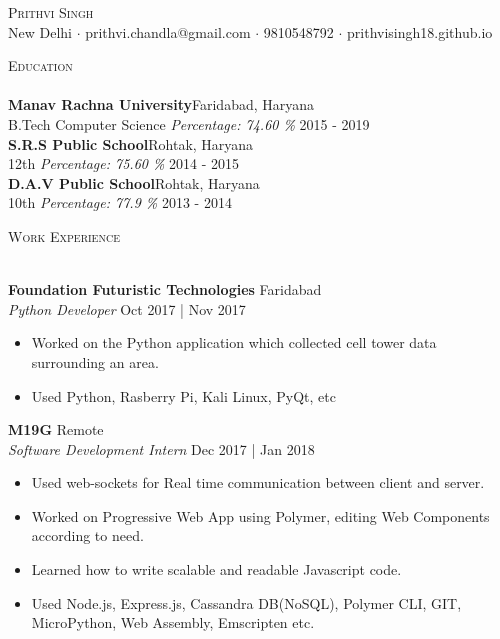 \documentclass[a4paper]{article}
\newcommand{\lineunder} {
    \vspace*{-8pt} \\
    \hspace*{-18pt} \hrulefill \\
}
\newcommand{\header} [1] {
    {\hspace*{-18pt}\vspace*{6pt} \textsc{#1}}
    \vspace*{-6pt} \lineunder
}
\begin{document}
\vspace*{-40pt}

    

\vspace*{-10pt}
\begin{center}
	{\Huge \scshape {Prithvi Singh}}\\
	New Delhi $\cdot$ prithvi.chandla@gmail.com $\cdot$ 9810548792 $\cdot$ prithvisingh18.github.io\\
\end{center}

\header{Education}
\textbf{Manav Rachna University}\hfill Faridabad, Haryana\\
B.Tech Computer Science \textit{Percentage: 74.60 \%} \hfill 2015 - 2019\\
\vspace{2mm}
\textbf{S.R.S Public School}\hfill Rohtak, Haryana\\
12th \textit{Percentage: 75.60 \%} \hfill 2014 - 2015\\
\vspace{2mm}
\textbf{D.A.V Public School}\hfill Rohtak, Haryana\\
10th \textit{Percentage: 77.9 \%} \hfill 2013 - 2014\\
\vspace{2mm}

\header{Work Experience}
\vspace{1mm}

\textbf{Foundation Futuristic Technologies} \hfill Faridabad\\
\textit{Python Developer} \hfill Oct 2017 | Nov 2017\\
\vspace{-1mm}
\begin{itemize} \itemsep 1pt
	\item Worked on the Python application which collected cell tower data surrounding an area.
	\item Used Python, Rasberry Pi, Kali Linux, PyQt, etc
\end{itemize}
\textbf{M19G} \hfill Remote\\
\textit{Software Development Intern} \hfill Dec 2017 | Jan 2018\\
\vspace{-1mm}
\begin{itemize} \itemsep 1pt
  \item Used web-sockets for Real time communication between client and server.
	\item Worked on Progressive Web App using Polymer, editing Web Components according to need.
	\item Learned how to write scalable and readable Javascript code.
	\item Used Node.js, Express.js, Cassandra DB(NoSQL), Polymer CLI, GIT, MicroPython, Web Assembly, Emscripten etc.
\end{itemize}
\end{document}
